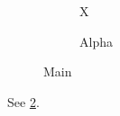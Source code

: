 \documentclass{article}
\begin{document}
\begin{figure}
\begin{subfigure}{0.4\textwidth}X\caption{Alpha}\label{a}\end{subfigure}
\caption{Main}
\end{figure}
See \ref{a}.
\end{document}
